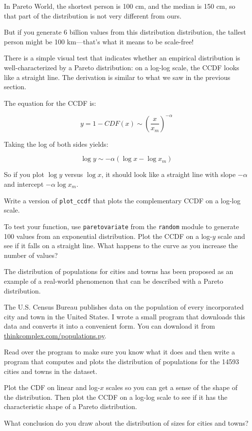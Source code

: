 \documentclass[10pt]{book}
\begin{document}
In Pareto World, the shortest person is 100 cm,
and the median is 150 cm, so that part of the distribution is not
very different from ours.

But if you generate 6 billion values from this distribution
distribution, the tallest person might
be 100 km---that's what it means to
be scale-free!

There is a simple visual test that indicates whether an empirical
distribution is well-characterized by a Pareto distribution: on a
log-log scale, the CCDF looks like a straight line.  The derivation is
similar to what we saw in the previous section.

The equation for the CCDF is:

\[ y = 1 - CDF(x) \sim \left( \frac{x}{x_m} \right) ^{-\alpha} \]

Taking the log of both sides yields:

\[ \log y \sim -\alpha (\log x - \log x_m ) \]

So if you plot $\log y$ versus $\log x$, it should look like a
straight line with slope $-\alpha$ and intercept $-\alpha \log x_m$.

\begin{exercise}

Write a version of \verb"plot_ccdf" that plots the complementary
CCDF on a log-log scale.

To test your function, use {\tt paretovariate} from the {\tt random}
module to generate 100 values from an exponential distribution.  Plot
the CCDF on a log-$y$ scale and see if it falls on a straight line.
What happens to the curve as you increase the number of values?

\end{exercise}


\begin{exercise}

The distribution of populations for cities and towns has been proposed
as an example of a real-world phenomenon that can be described
with a Pareto distribution.

The U.S. Census Bureau publishes data on the population of every
incorporated city and town in the United States.  I wrote a
small program that downloads this data and converts it into a
convenient form.  You can download it from
\url{thinkcomplex.com/populations.py}.

Read over the program to make sure you know what it does and then
write a program that computes and plots the distribution of
populations for the 14593 cities and towns in the dataset.

Plot the CDF on linear and log-$x$ scales so you can get a sense of
the shape of the distribution.  Then plot the CCDF on a log-log scale
to see if it has the characteristic shape of a Pareto distribution.

What conclusion do you draw about the distribution of sizes
for cities and towns?

\end{exercise}
\end{document}
